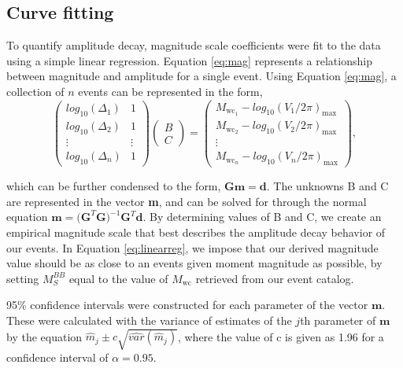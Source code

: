 \documentclass{gji}
\begin{document}
\subsection{Curve fitting}
To quantify amplitude decay, magnitude scale coefficients were fit to the data using a simple linear regression. Equation \ref{eq:mag} represents a relationship between magnitude and amplitude for a single event. Using Equation \ref{eq:mag}, a collection of $n$ events can be represented in the form, 
\begin{equation}
	\begin{pmatrix}
		log_{10}(\Delta_{1}) & 1 \\
		log_{10}(\Delta_{2}) & 1 \\
		\vdots  & \vdots \\
		log_{10}(\Delta_{n}) & 1 
	\end{pmatrix}
	\begin{pmatrix}
		{B}\\
		{C}
	\end{pmatrix}
	=
	\begin{pmatrix}
		M_{\text{wc}_1} - log_{10}({V_1}/{2\pi})_{\text{max}} \\
		M_{\text{wc}_2} - log_{10}({V_2}/{2\pi})_{\text{max}} \\
		\vdots  \\
		M_{\text{wc}_n} - log_{10}({V_n}/{2\pi})_{\text{max}}
	\end{pmatrix},
	\label{eq:linearreg}
\end{equation}

\noindent which can be further condensed to the form, $\mathbf{Gm = d}$. The unknowns B and C are represented in the vector {\bfseries m}, and can be solved for through the normal equation $\mathbf{m} = \mathbf{(G}^{T}\mathbf{G})^{-1}\mathbf{G}^T\mathbf{d}$.
By determining values of B and C, we create an empirical magnitude scale that best describes the amplitude decay behavior of our events. In Equation \ref{eq:linearreg}, we impose that our derived magnitude value should be as close to an events given moment magnitude as possible, by setting $M_S^{BB}$ equal to the value of $M_\text{wc}$ retrieved from our event catalog. 

95\% confidence intervals were constructed for each parameter of the vector $\mathbf{m}$. These were calculated with the variance of estimates of the $j$th parameter of $\mathbf{m}$ by the equation $\hat{m}_j \pm c \sqrt{\hat{var}(\hat{m}_j)}$, where the value of c is given as 1.96 for a confidence interval of $\alpha = 0.95$.
\end{document}
